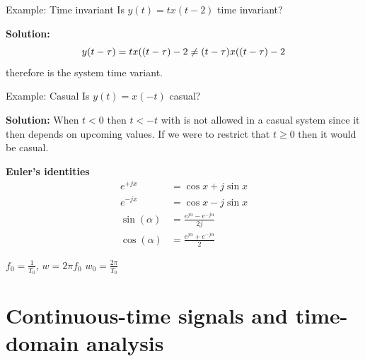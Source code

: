 \begin{multicols}{2}
\begin{exampleblock}{Example: Time invariant}
Is $y(t)=tx(t-2)$ time invariant? 

\textbf{Solution:}
\begin{equation*}
    y(t-\tau) = tx((t-\tau)-2 \neq (t-\tau)x((t-\tau)-2 \\
\end{equation*}
therefore is the system time variant.
\end{exampleblock}

\vspace{1cm}
\begin{exampleblock}{Example: Casual}
Is $y(t)=x(-t)$ casual? 

\textbf{Solution:}
When $t<0$ then $t<-t$ with is not allowed in a casual system since it then depends on
upcoming values. If we were to restrict that $t\geq0$ then it would be casual.
\end{exampleblock}


\noindent\textbf{Euler's identities}
\begin{align*}
  e^{+jx} &= \cos{x} + j\sin{x} \\
  e^{-jx} &= \cos{x} - j\sin{x} \\
  \sin(\alpha) &= \frac{e^{j\alpha}-e^{-j\alpha}}{2j} \\
  \cos(\alpha) &= \frac{e^{j\alpha}+e^{-j\alpha}}{2}
\end{align*}

$f_0=\frac{1}{T_0}$, $w=2\pi f_0$
$w_0=\frac{2\pi}{T_0}$


\section{Continuous-time signals and time-domain analysis}


\end{multicols}
